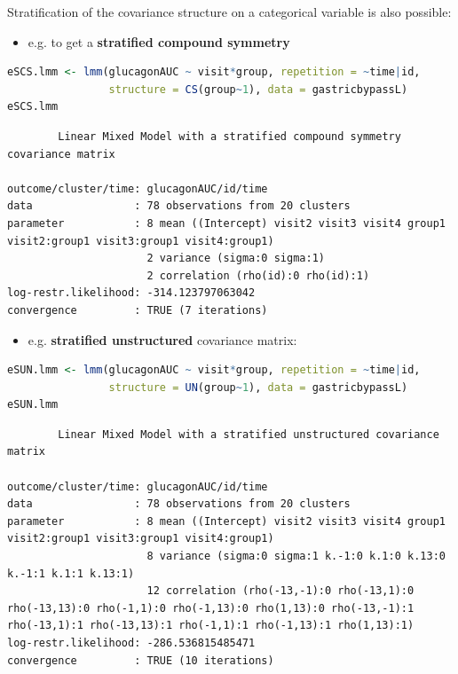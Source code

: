 \documentclass[12pt]{article}
\begin{document}
\noindent Stratification of the covariance structure on a categorical
variable is also possible:
\begin{itemize}
\item e.g. to get a \textbf{stratified compound symmetry}
\end{itemize}
\begin{lstlisting}[language=r,numbers=none]
eSCS.lmm <- lmm(glucagonAUC ~ visit*group, repetition = ~time|id,
                structure = CS(group~1), data = gastricbypassL)
eSCS.lmm
\end{lstlisting}

\label{}
\begin{verbatim}
		Linear Mixed Model with a stratified compound symmetry covariance matrix 

outcome/cluster/time: glucagonAUC/id/time 
data                : 78 observations from 20 clusters 
parameter           : 8 mean ((Intercept) visit2 visit3 visit4 group1 visit2:group1 visit3:group1 visit4:group1) 
                      2 variance (sigma:0 sigma:1) 
                      2 correlation (rho(id):0 rho(id):1) 
log-restr.likelihood: -314.123797063042 
convergence         : TRUE (7 iterations)
\end{verbatim}


\clearpage

\begin{itemize}
\item e.g. \textbf{stratified unstructured} covariance matrix:
\end{itemize}
\begin{lstlisting}[language=r,numbers=none]
eSUN.lmm <- lmm(glucagonAUC ~ visit*group, repetition = ~time|id,
                structure = UN(group~1), data = gastricbypassL)
eSUN.lmm
\end{lstlisting}
\label{}
\begin{verbatim}
		Linear Mixed Model with a stratified unstructured covariance matrix 

outcome/cluster/time: glucagonAUC/id/time 
data                : 78 observations from 20 clusters 
parameter           : 8 mean ((Intercept) visit2 visit3 visit4 group1 visit2:group1 visit3:group1 visit4:group1) 
                      8 variance (sigma:0 sigma:1 k.-1:0 k.1:0 k.13:0 k.-1:1 k.1:1 k.13:1) 
                      12 correlation (rho(-13,-1):0 rho(-13,1):0 rho(-13,13):0 rho(-1,1):0 rho(-1,13):0 rho(1,13):0 rho(-13,-1):1 rho(-13,1):1 rho(-13,13):1 rho(-1,1):1 rho(-1,13):1 rho(1,13):1) 
log-restr.likelihood: -286.536815485471 
convergence         : TRUE (10 iterations)
\end{verbatim}
\end{document}
